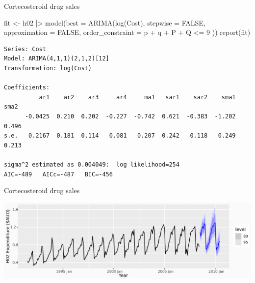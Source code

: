 \documentclass[
  14pt,
  ignorenonframetext,
  aspectratio=169,
]{beamer}
\newenvironment{Shaded}{\begin{snugshade}}{\end{snugshade}}
\newcommand{\AttributeTok}[1]{\textcolor[rgb]{0.77,0.63,0.00}{#1}}
\newcommand{\ConstantTok}[1]{\textcolor[rgb]{0.00,0.00,0.00}{#1}}
\newcommand{\DecValTok}[1]{\textcolor[rgb]{0.00,0.00,0.81}{#1}}
\newcommand{\FunctionTok}[1]{\textcolor[rgb]{0.00,0.00,0.00}{#1}}
\newcommand{\NormalTok}[1]{\textcolor[rgb]{0.00,0.00,0.00}{#1}}
\newcommand{\OtherTok}[1]{\textcolor[rgb]{0.56,0.35,0.01}{#1}}
\newcommand{\SpecialCharTok}[1]{\textcolor[rgb]{0.00,0.00,0.00}{#1}}
\newcommand{\StringTok}[1]{\textcolor[rgb]{0.31,0.60,0.02}{#1}}
\renewenvironment{Shaded}{\vspace*{0.15cm}\color{black}\fontsize{10}{10}\sf\begin{snugshade}\color{black}}{\end{snugshade}}
\begin{document}
\begin{frame}[fragile]{Cortecosteroid drug sales}
\protect\hypertarget{cortecosteroid-drug-sales-7}{}
\fontsize{9}{9}\sf

\begin{Shaded}
\begin{Highlighting}[]
\NormalTok{fit }\OtherTok{\textless{}{-}}\NormalTok{ h02 }\SpecialCharTok{|\textgreater{}}
  \FunctionTok{model}\NormalTok{(}\AttributeTok{best =} \FunctionTok{ARIMA}\NormalTok{(}\FunctionTok{log}\NormalTok{(Cost),}
    \AttributeTok{stepwise =} \ConstantTok{FALSE}\NormalTok{,}
    \AttributeTok{approximation =} \ConstantTok{FALSE}\NormalTok{,}
    \AttributeTok{order\_constraint =}\NormalTok{ p }\SpecialCharTok{+}\NormalTok{ q }\SpecialCharTok{+}\NormalTok{ P }\SpecialCharTok{+}\NormalTok{ Q }\SpecialCharTok{\textless{}=} \DecValTok{9}
\NormalTok{  ))}
\FunctionTok{report}\NormalTok{(fit)}
\end{Highlighting}
\end{Shaded}

\begin{verbatim}
Series: Cost 
Model: ARIMA(4,1,1)(2,1,2)[12] 
Transformation: log(Cost) 

Coefficients:
          ar1    ar2    ar3     ar4     ma1   sar1    sar2    sma1   sma2
      -0.0425  0.210  0.202  -0.227  -0.742  0.621  -0.383  -1.202  0.496
s.e.   0.2167  0.181  0.114   0.081   0.207  0.242   0.118   0.249  0.213

sigma^2 estimated as 0.004049:  log likelihood=254
AIC=-489   AICc=-487   BIC=-456
\end{verbatim}
\end{frame}

\begin{frame}[fragile]{Cortecosteroid drug sales}
\protect\hypertarget{cortecosteroid-drug-sales-8}{}
\fontsize{11}{14}\sf

\begin{Shaded}
\end{Shaded}

\includegraphics{04_arima_files/figure-beamer/h02f-1.pdf}
\end{frame}
\end{document}
